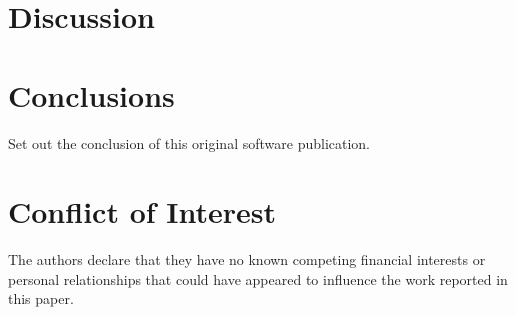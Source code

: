 \documentclass[preprint,12pt,letterpaper]{elsarticle}
\begin{document}


\section{Discussion}
\label{s:discussion}

%
%
%
%
%


\section{Conclusions}
\label{s:conclusions}

Set out the conclusion of this original software publication.


\section{Conflict of Interest}


The authors declare that they have no known competing financial interests or personal relationships that could have appeared to influence the work reported in this paper.
\end{document}
